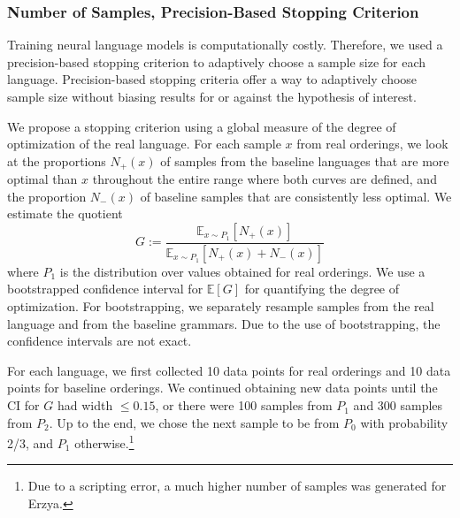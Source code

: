 \documentclass[11pt,letterpaper]{article}
\newcommand{\E}[0]{\mathbb{E}}
\begin{document}
\subsubsection{Number of Samples, Precision-Based Stopping Criterion}\label{ref:stopping-criterion}
Training neural language models is computationally costly.
Therefore, we used a precision-based stopping criterion to adaptively choose a sample size for each language.
Precision-based stopping criteria offer a way to adaptively choose sample size without biasing results for or against the hypothesis of interest.

We propose a stopping criterion using a global measure of the degree of optimization of the real language.
For each sample $x$ from real orderings, we look at the proportions $N_+(x)$ of samples from the baseline languages that are more optimal than $x$ throughout the entire range where both curves are defined, and the proportion $N_-(x)$ of baseline samples that are consistently less optimal.
We estimate the quotient
\begin{equation}\label{eq:g}
	G :=	\frac{\E_{x \sim P_1}[N_+(x)]}{\E_{x \sim P_1}[N_+(x) + N_-(x)]}
\end{equation}
where $P_1$ is the distribution over values obtained for real orderings.
We use a bootstrapped confidence interval for $\E[G]$ for quantifying the degree of optimization.
For bootstrapping, we separately resample samples from the real language and from the baseline grammars.
Due to the use of bootstrapping, the confidence intervals are not exact.



For each language, we first collected 10 data points for real orderings and 10 data points for baseline orderings.
We continued obtaining new data points until the CI for $G$ had width $\leq 0.15$, or there were 100 samples from $P_1$ and 300 samples from $P_2$.
Up to the end, we chose the next sample to be from $P_0$ with probability 2/3, and $P_1$ otherwise.\footnote{Due to a scripting error, a much higher number of samples was generated for Erzya.}
\end{document}
